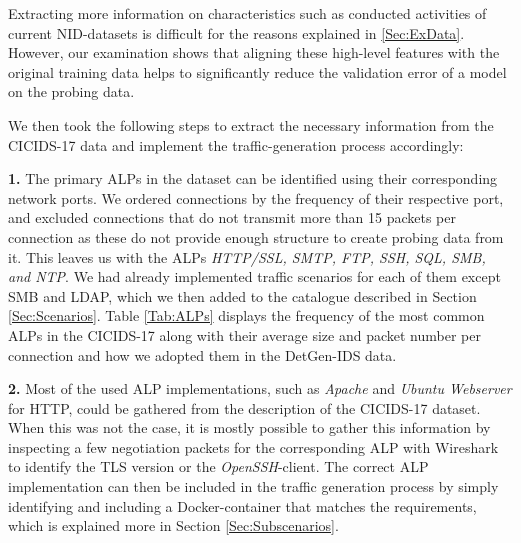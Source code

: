 Extracting more information on characteristics such as conducted activities of current NID-datasets is difficult for the reasons explained in \ref{Sec:ExData}. However, our examination shows that aligning these high-level features with the original training data helps to significantly reduce the validation error of a model on the probing data.

We then took the following steps to extract the necessary information from the CICIDS-17 data and implement the traffic-generation process accordingly:

\textbf{1.} The primary ALPs in the dataset can be identified using their corresponding network ports. We ordered connections by the frequency of their respective port, and excluded connections that do not transmit more than 15 packets per connection as these do not provide enough structure to create probing data from it. This leaves us with the ALPs \textit{HTTP/SSL, SMTP, FTP, SSH, SQL, SMB, and NTP}. We had already implemented traffic scenarios for each of them except SMB and LDAP, which we then added to the catalogue described in Section \ref{Sec:Scenarios}. Table \ref{Tab:ALPs} displays the frequency of the most common ALPs in the CICIDS-17 along with their average size and packet number per connection and how we adopted them in the DetGen-IDS data.

\textbf{2.} Most of the used ALP implementations, such as \textit{Apache} and \textit{Ubuntu Webserver} for HTTP, could be gathered from the description of the CICIDS-17 dataset. When this was not the case, it is mostly possible to gather this information by inspecting a few negotiation packets for the corresponding ALP with Wireshark to identify the TLS version or the \textit{OpenSSH}-client. The correct ALP implementation can then be included in the traffic generation process by simply identifying and including a Docker-container that matches the requirements, which is explained more in Section \ref{Sec:Subscenarios}.


